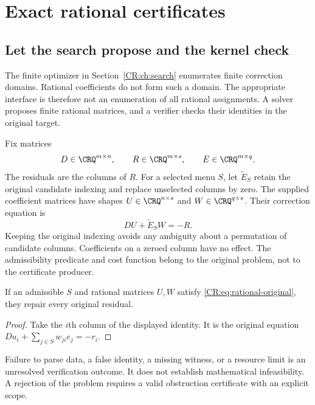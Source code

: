 \section{Exact rational certificates}\label{CR:cr-source-section-8}\label{CR:ch:rational}
\subsection{Let the search propose and the kernel check}
The finite optimizer in Section~\ref{CR:ch:search} enumerates finite correction domains. Rational coefficients do not form such a domain. The appropriate interface is therefore not an enumeration of all rational assignments. A solver proposes finite rational matrices, and a verifier checks their identities in the original target.

Fix matrices
\[
 D\in\CRQ^{m\times n},\qquad R\in\CRQ^{m\times s},\qquad E\in\CRQ^{m\times q}.
\]
The residuals are the columns of $R$. For a selected menu $S$, let $\widetilde E_S$ retain the original candidate indexing and replace unselected columns by zero. The supplied coefficient matrices have shapes $U\in\CRQ^{n\times s}$ and $W\in\CRQ^{q\times s}$. Their correction equation is
\begin{equation}\label{CR:eq:rational-original}
 DU+\widetilde E_SW=-R.
\end{equation}
Keeping the original indexing avoids any ambiguity about a permutation of candidate columns. Coefficients on a zeroed column have no effect. The admissibility predicate and cost function belong to the original problem, not to the certificate producer.

\begin{CRproposition}\label{CR:prop:rational-success}
If an admissible $S$ and rational matrices $U,W$ satisfy \eqref{CR:eq:rational-original}, they repair every original residual.
\end{CRproposition}
\begin{proof}
Take the $i$th column of the displayed identity. It is the original equation $Du_i+\sum_{j\in S}w_{ji}e_j=-r_i$.
\end{proof}

\begin{scopebox}[title=A rejected certificate is not a rejected problem]
Failure to parse data, a false identity, a missing witness, or a resource limit is an unresolved verification outcome. It does not establish mathematical infeasibility. A rejection of the problem requires a valid obstruction certificate with an explicit scope.
\end{scopebox}

